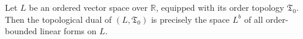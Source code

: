 Let $L$ be an ordered vector space over $\mathbb{R}$, equipped with its order topology $\mathfrak{T}_0$. Then the topological dual of $(L, \mathfrak{T}_0)$ is precisely the space $L^b$ of all order-bounded linear forms on $L$.
